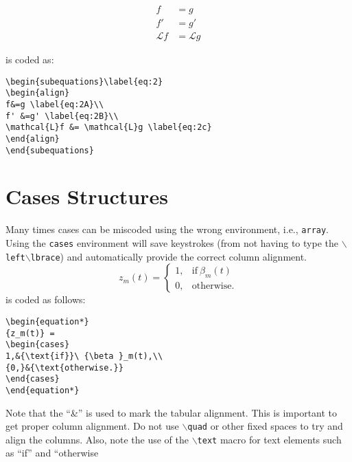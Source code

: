 \documentclass[lettersize,journal]{IEEEtran}
\begin{document}
\begin{subequations}\label{eq:2}
\begin{align}
f&=g \label{eq:2A}\\
f' &=g' \label{eq:2B}\\
\mathcal{L}f &= \mathcal{L}g \label{eq:2c}
\end{align}
\end{subequations}

\noindent is coded as:
\begin{verbatim}
\begin{subequations}\label{eq:2}
\begin{align}
f&=g \label{eq:2A}\\
f' &=g' \label{eq:2B}\\
\mathcal{L}f &= \mathcal{L}g \label{eq:2c}
\end{align}
\end{subequations}

\end{verbatim}

\section{Cases Structures}
Many times cases can be miscoded using the wrong environment, i.e., {\tt{array}}. Using the {\tt{cases}} environment will save keystrokes (from not having to type the $\backslash${\tt{left}}$\backslash${\tt{lbrace}}) and automatically provide the correct column alignment.
\begin{equation*}
{z_m(t)} = \begin{cases}
1,&{\text{if}}\ {\beta }_m(t) \\ 
{0,}&{\text{otherwise.}} 
\end{cases}
\end{equation*}
\noindent is coded as follows:
\begin{verbatim}
\begin{equation*}
{z_m(t)} = 
\begin{cases}
1,&{\text{if}}\ {\beta }_m(t),\\ 
{0,}&{\text{otherwise.}} 
\end{cases}
\end{equation*}
\end{verbatim}
\noindent Note that the ``\&'' is used to mark the tabular alignment. This is important to get  proper column alignment. Do not use $\backslash${\tt{quad}} or other fixed spaces to try and align the columns. Also, note the use of the $\backslash${\tt{text}} macro for text elements such as ``if'' and ``otherwise
\end{document}
